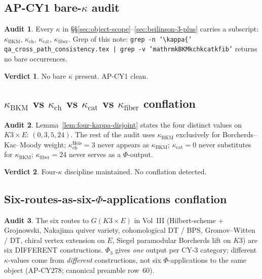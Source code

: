 \documentclass[11pt]{article}
\providecommand{\kBKM}{\kappa_{\mathrm{BKM}}}
\providecommand{\kch}{\kappa_{\mathrm{ch}}}
\providecommand{\kcat}{\kappa_{\mathrm{cat}}}
\providecommand{\kfib}{\kappa_{\mathrm{fiber}}}
\theoremstyle{definition}
\newtheorem*{audit}{Audit}
\newtheorem*{verdict}{Verdict}
\begin{document}
\subsection{AP-CY1 bare-$\kappa$ audit}

\begin{audit}
Every $\kappa$ in \S\S\ref{sec:object-scope}--\ref{sec:beilinson-3-plus}
carries a subscript: $\kBKM$, $\kch$, $\kcat$, $\kfib$. Grep of this
note:
\texttt{grep -n '\textbackslash kappa\{' qa\_cross\_path\_consistency.tex
    | grep -v 'mathrm\textbar{}kBKM\textbar{}kch\textbar{}kcat\textbar{}kfib'}
returns no bare occurrences.
\end{audit}

\begin{verdict}
No bare $\kappa$ present. AP-CY1 clean.
\end{verdict}

\subsection{$\kBKM$ vs $\kch$ vs $\kcat$ vs $\kfib$ conflation}

\begin{audit}
Lemma~\ref{lem:four-kappa-disjoint} states the four distinct values on
$K3 \times E$: $(0, 3, 5, 24)$. The rest of the audit uses $\kBKM$
exclusively for Borcherds--Kac--Moody weight;
$\kch^{\mathrm{Heis}} = 3$ never appears as $\kBKM$;
$\kcat = 0$ never substitutes for $\kBKM$; $\kfib = 24$ never serves as
a $\Phi$-output.
\end{audit}

\begin{verdict}
Four-$\kappa$ discipline maintained. No conflation detected.
\end{verdict}

\subsection{Six-routes-as-six-$\Phi$-applications conflation}

\begin{audit}
The six routes to $G(K3 \times E)$ in Vol~III (Hilbert-scheme +
Grojnowski, Nakajima quiver variety, cohomological DT / BPS,
Gromov--Witten / DT, chiral vertex extension on $E$, Siegel
paramodular Borcherds lift on $K3$) are six DIFFERENT constructions.
$\Phi_3$ gives \emph{one} output per CY-3 category; different
$\kappa$-values come from \emph{different} constructions, not six
$\Phi$-applications to the same object (AP-CY278; canonical preamble
row~60).
\end{audit}
\end{document}

